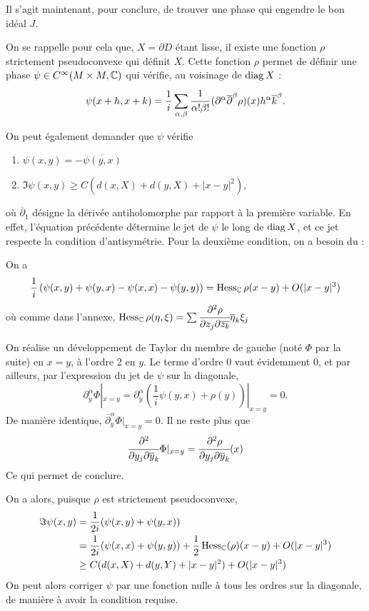 Il s'agit maintenant, pour conclure, de trouver une phase qui engendre le bon idéal $J$.

On se rappelle pour cela que, $X=\partial D$ étant lisse, il existe une fonction $\rho$ strictement pseudoconvexe qui définit $X$. Cette fonction $\rho$ permet de définir une phase $\psi \in C^{\infty}(M \times M,\mathbb{C})$ qui vérifie, au voisinage de $\operatorname{diag} X$ :
\begin{equation*}
	\psi(x+h,x+k) = \frac1i \sum_{\alpha,\beta}\cfrac{1}{\alpha !\beta!}\,(\partial^{\alpha}\overline{\partial}^{\beta}\rho)(x)h^{\alpha}\overline{k}^{\beta}.
\end{equation*}

On peut également demander que $\psi$ vérifie 
\begin{enumerate}
	\item $\psi(x,y)=-\overline{\psi(y,x)}$
	\item $\Im \psi(x,y) \geq C(d(x,X)+d(y,X) + |x-y|^2)$,
\end{enumerate}
où $\overline{\partial}_1$ désigne la dérivée antiholomorphe par rapport à la première variable. En effet, l'équation précédente détermine le jet de $\psi$ le long de $\operatorname{diag} X$, et ce jet respecte la condition d'antisymétrie. Pour la deuxième condition, on a besoin du :
\begin{lem} On a 
	\begin{equation*}
	\frac{1}{i}\left(\psi(x,y) + \psi(y,x)-\psi(x,x)-\psi(y,y) \right)= \operatorname{Hess}_{\mathbb{C}}\rho(x-y) + O(|x-y|^3)
	\end{equation*}
	où comme dans l'annexe, $\operatorname{Hess}_{\mathbb{C}}\rho(\eta,\xi)=\sum \cfrac{\partial^2\rho}{\partial z_j \partial \overline{z_k}}\overline{\eta}_k\xi_j$
\end{lem}
\begin{preuve}
	On réalise un développement de Taylor du membre de gauche (noté $\Phi$ par la suite) en $x=y$, à l'ordre 2 en $y$. Le terme d'ordre 0 vaut évidemment $0$, et par ailleurs, par l'expression du jet de $\psi$ sur la diagonale,
	\begin{equation*}
		\partial^{\alpha}_y\Phi|_{x=y} = \partial^{\alpha}_y(\frac{1}{i}\psi(y,x) + \rho(y))|_{x=y}=0.
	\end{equation*}
	De manière identique, $\overline{\partial}^{\alpha}_y\Phi|_{x=y}=0$. Il ne reste plus que
	\begin{equation*}
		\cfrac{\partial^2 }{\partial y_j\partial \overline{y}_k}\Phi|_{x=y} = \cfrac{\partial^2 \rho}{\partial y_j\partial \overline{y}_k}(x)
	\end{equation*}
	Ce qui permet de conclure.
\end{preuve}
On a alors, puisque $\rho$ est strictement pseudoconvexe,
\begin{align*}
	\Im \psi (x,y) &= \frac{1}{2i}(\psi(x,y)+\psi(y,x)) \\
	&= \frac{1}{2i}(\psi(x,x)+\psi(y,y)) + \frac{1}{2}\operatorname{Hess}_{\mathbb{C}}(\rho)(x-y)+O(|x-y|^3)\\
	&\geq C(d(x,X)+d(y,Y) + |x-y|^2) + O(|x-y|^3)
\end{align*}
On peut alors corriger $\psi$ par une fonction nulle à tous les ordres sur la diagonale, de manière à avoir la condition requise.

